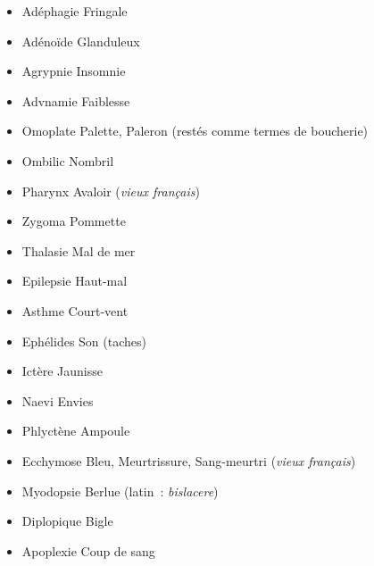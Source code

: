 \documentclass[french,twoside]{book} %
\begin{document}
\begin{itemize}[itemsep=0pt,]
\item Adéphagie Fringale
\item Adénoïde Glanduleux
\item Agrypnie Insomnie
\item Advnamie Faiblesse
\item Omoplate Palette, Paleron (restés comme termes de boucherie)
\item Ombilic Nombril
\item Pharynx Avaloir ({\itshape vieux français})
\item Zygoma Pommette
\item Thalasie Mal de mer
\item Epilepsie Haut-mal
\item Asthme Court-vent
\item Ephélides Son (taches)
\item Ictère Jaunisse
\item Naevi Envies
\item Phlyctène Ampoule
\item Ecchymose Bleu, Meurtrissure, Sang-meurtri ({\itshape vieux français})
\item Myodopsie Berlue (latin : {\itshape bislacere})
\item Diplopique Bigle
\item Apoplexie Coup de sang
\end{itemize}
\end{document}
